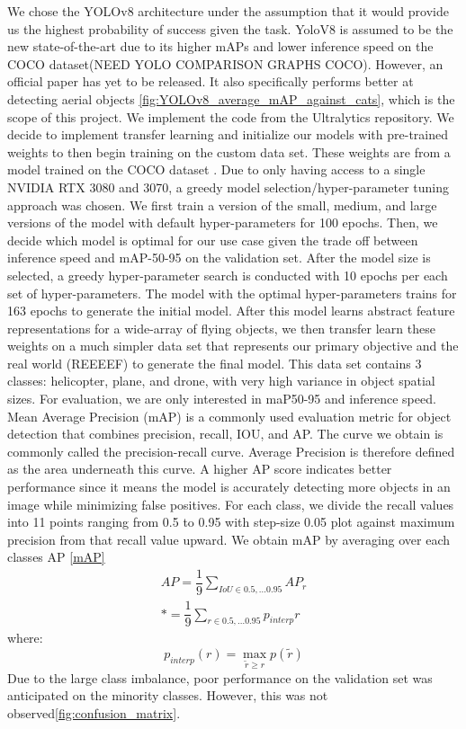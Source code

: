 \documentclass[10pt,twocolumn,letterpaper]{article}
\begin{document}
We chose the YOLOv8 architecture under the assumption that it would provide us the highest probability of success given the task. YoloV8 is 
assumed to be the new state-of-the-art due to its higher mAPs and lower inference speed on the COCO dataset(NEED YOLO COMPARISON GRAPHS COCO). However, an official paper has 
yet to be released. It also specifically performs better at detecting aerial objects \ref{fig:YOLOv8_average_mAP_against_cats}, which is the scope of this project. We implement the code
from the Ultralytics repository. We decide to implement transfer learning and initialize our models with pre-trained weights to then begin training on the 
custom data set. These weights are from a model trained on the COCO dataset \cite{coco}. Due to only having access to a single NVIDIA RTX 3080 and 3070, 
a greedy model selection/hyper-parameter tuning approach was chosen. We first train a version of the small, medium, and large versions of the 
model with default hyper-parameters for 100 epochs. Then, we decide which model is optimal for our use case given the trade off between inference 
speed and mAP-50-95 on the validation set. After the model size is selected, a greedy hyper-parameter search is conducted with 10 epochs per each 
set of hyper-parameters. The model with the optimal hyper-parameters trains for 163 epochs to generate the initial model. After this model learns abstract feature representations for a wide-array of flying objects, we then transfer learn these weights on a much simpler data set that represents our primary objective and the real world (REEEEF) to generate the final model. This data set contains 3 classes: helicopter, plane, and drone, with very high variance in object spatial sizes. For evaluation, we are only interested in maP50-95 and inference speed.
Mean Average Precision (mAP) is a commonly used evaluation metric for object detection that combines precision, recall, IOU, and AP. The curve we obtain is commonly called the precision-recall curve. Average Precision is therefore defined as the area underneath this curve. A higher AP score indicates better performance since it means the model is accurately detecting more objects in an image while minimizing false positives.
For each class, we divide the recall values into 11 points ranging from 0.5 to 0.95 with step-size 0.05 plot against maximum precision from that recall value upward. We obtain mAP by averaging over each classes AP \ref{mAP}\\ 

\begin{align}\label{mAP}
AP=\dfrac{1}{9}\sum_{IoU\in{0.5,...0.95}}AP_r \\*
=\dfrac{1}{9}\sum_{r\in{0.5,...0.95}}p_{interp}{r}
\end{align}
where:
\begin{equation*}
p_{interp}({r}) = \max_{\widetilde{r}\geq{r}} p(\widetilde{r})
\end{equation*}
Due to the large class imbalance, poor performance on the validation set was anticipated on the minority classes. However, this was not observed\ref{fig:confusion_matrix}.
\end{document}
